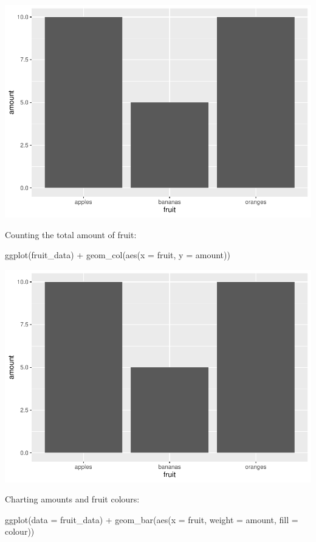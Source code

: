 \documentclass[
]{book}
\newenvironment{Shaded}{\begin{snugshade}}{\end{snugshade}}
\newcommand{\AttributeTok}[1]{\textcolor[rgb]{0.77,0.63,0.00}{#1}}
\newcommand{\FunctionTok}[1]{\textcolor[rgb]{0.00,0.00,0.00}{#1}}
\newcommand{\NormalTok}[1]{#1}
\newcommand{\SpecialCharTok}[1]{\textcolor[rgb]{0.00,0.00,0.00}{#1}}
\begin{document}
\includegraphics{_main_files/figure-latex/unnamed-chunk-25-1.pdf}

Counting the total amount of fruit:

\begin{Shaded}
\begin{Highlighting}[]
\FunctionTok{ggplot}\NormalTok{(fruit\_data) }\SpecialCharTok{+} \FunctionTok{geom\_col}\NormalTok{(}\FunctionTok{aes}\NormalTok{(}\AttributeTok{x =}\NormalTok{ fruit, }\AttributeTok{y =}\NormalTok{ amount))}
\end{Highlighting}
\end{Shaded}

\includegraphics{_main_files/figure-latex/unnamed-chunk-26-1.pdf}

Charting amounts and fruit colours:

\begin{Shaded}
\begin{Highlighting}[]
\FunctionTok{ggplot}\NormalTok{(}\AttributeTok{data =}\NormalTok{ fruit\_data) }\SpecialCharTok{+} \FunctionTok{geom\_bar}\NormalTok{(}\FunctionTok{aes}\NormalTok{(}\AttributeTok{x =}\NormalTok{ fruit, }\AttributeTok{weight =}\NormalTok{ amount, }\AttributeTok{fill =}\NormalTok{ colour)) }
\end{Highlighting}
\end{Shaded}
\end{document}
